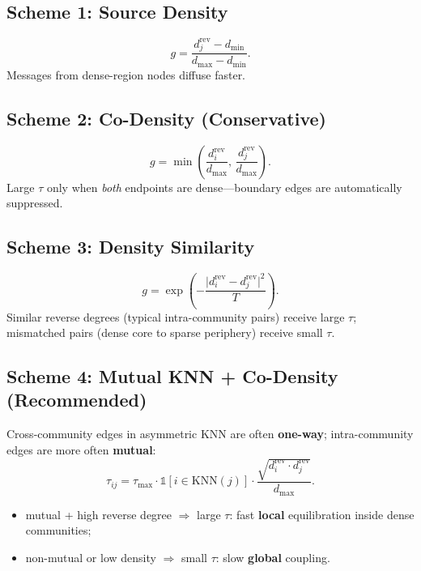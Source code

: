 \documentclass[11pt,a4paper]{report}
\begin{document}
\subsection{Scheme 1: Source Density}

\begin{equation}
    g = \frac{d^{\mathrm{rev}}_j - d_{\min}}{d_{\max} - d_{\min}}.
\end{equation}
Messages from dense-region nodes diffuse faster.

\subsection{Scheme 2: Co-Density (Conservative)}

\begin{equation}
    g = \min\!\left(\frac{d^{\mathrm{rev}}_i}{d_{\max}},\, \frac{d^{\mathrm{rev}}_j}{d_{\max}}\right).
\end{equation}
Large $\tau$ only when \emph{both} endpoints are dense---boundary edges are automatically suppressed.

\subsection{Scheme 3: Density Similarity}

\begin{equation}
    g = \exp\!\left(-\frac{\bigl|d^{\mathrm{rev}}_i - d^{\mathrm{rev}}_j\bigr|^2}{T}\right).
\end{equation}
Similar reverse degrees (typical intra-community pairs) receive large $\tau$; mismatched pairs (dense core to sparse periphery) receive small $\tau$.

\subsection{Scheme 4: Mutual KNN + Co-Density (Recommended)}

Cross-community edges in asymmetric KNN are often \textbf{one-way}; intra-community edges are more often \textbf{mutual}:
\begin{equation}
    \tau_{ij} = \tau_{\max}\cdot \mathbb{1}[i \in \mathrm{KNN}(j)]\cdot \frac{\sqrt{d^{\mathrm{rev}}_i \cdot d^{\mathrm{rev}}_j}}{d_{\max}}.
\end{equation}

\begin{itemize}[noitemsep]
    \item mutual + high reverse degree $\Rightarrow$ large $\tau$: fast \textbf{local} equilibration inside dense communities;
    \item non-mutual or low density $\Rightarrow$ small $\tau$: slow \textbf{global} coupling.
\end{itemize}
\end{document}
